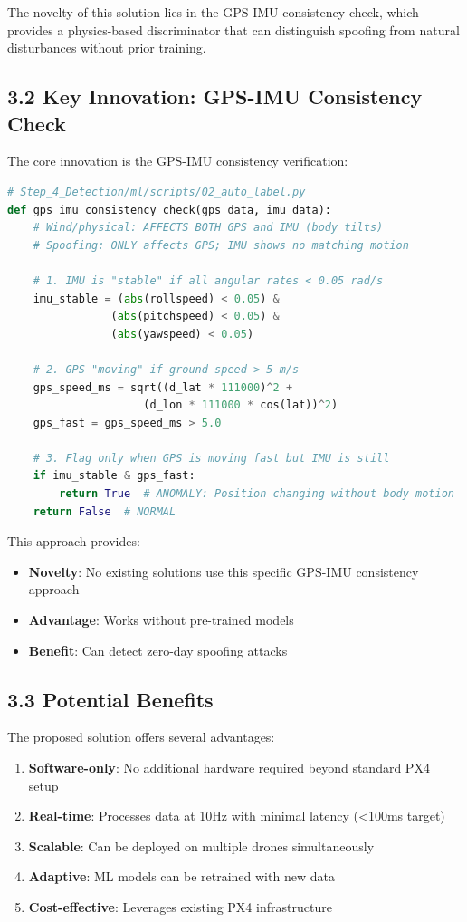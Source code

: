 \documentclass[12pt,a4paper]{article}
\begin{document}
The novelty of this solution lies in the GPS-IMU consistency check, which provides a physics-based discriminator that can distinguish spoofing from natural disturbances without prior training.

\subsection{3.2 Key Innovation: GPS-IMU Consistency Check}

The core innovation is the GPS-IMU consistency verification:

\begin{lstlisting}[language=python, style=pythonstyle]
# Step_4_Detection/ml/scripts/02_auto_label.py
def gps_imu_consistency_check(gps_data, imu_data):
    # Wind/physical: AFFECTS BOTH GPS and IMU (body tilts)
    # Spoofing: ONLY affects GPS; IMU shows no matching motion
    
    # 1. IMU is "stable" if all angular rates < 0.05 rad/s
    imu_stable = (abs(rollspeed) < 0.05) & 
                (abs(pitchspeed) < 0.05) & 
                (abs(yawspeed) < 0.05)
    
    # 2. GPS "moving" if ground speed > 5 m/s
    gps_speed_ms = sqrt((d_lat * 111000)^2 + 
                     (d_lon * 111000 * cos(lat))^2)
    gps_fast = gps_speed_ms > 5.0
    
    # 3. Flag only when GPS is moving fast but IMU is still
    if imu_stable & gps_fast:
        return True  # ANOMALY: Position changing without body motion
    return False  # NORMAL
\end{lstlisting}

This approach provides:

\begin{itemize}
    \item \textbf{Novelty}: No existing solutions use this specific GPS-IMU consistency approach
    \item \textbf{Advantage}: Works without pre-trained models
    \item \textbf{Benefit}: Can detect zero-day spoofing attacks
\end{itemize}

\subsection{3.3 Potential Benefits}

The proposed solution offers several advantages:

\begin{enumerate}
    \item \textbf{Software-only}: No additional hardware required beyond standard PX4 setup
    \item \textbf{Real-time}: Processes data at 10Hz with minimal latency (<100ms target)
    \item \textbf{Scalable}: Can be deployed on multiple drones simultaneously
    \item \textbf{Adaptive}: ML models can be retrained with new data
    \item \textbf{Cost-effective}: Leverages existing PX4 infrastructure
\end{enumerate}
\end{document}
